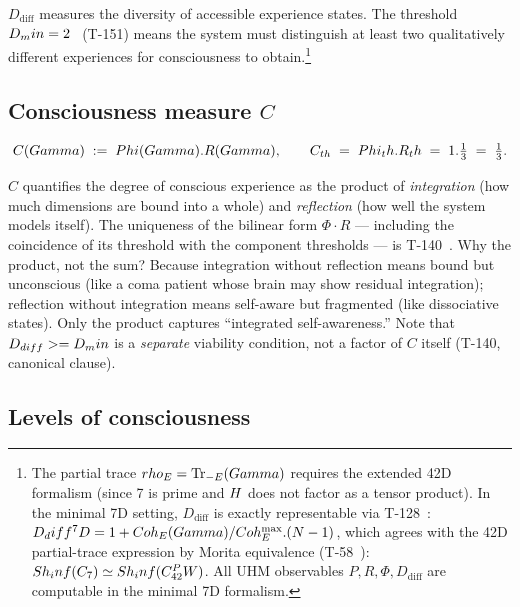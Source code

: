 $D_{\mathrm{diff}}$ measures the diversity of accessible experience states. The threshold
$D_min = 2$~ (T-151) means the system must distinguish at least two qualitatively
different experiences for consciousness to obtain.\footnote{The partial trace
$rho_E = \Tr_{-E}(Gamma)$ requires the extended 42D formalism (since 7 is prime and
$H$ does not factor as a tensor product). In the minimal 7D setting, $D_{\mathrm{diff}}$
is exactly representable via T-128~: $D_diff^7D = 1 + Coh_E(Gamma)/Coh_E^{\max}.(N-1)$,
which agrees with the 42D partial-trace expression by Morita equivalence (T-58~):
$Sh_inf(C_7) \simeq Sh_inf(C_{42}^PW)$. All UHM observables
$P, R, \Phi, D_\mathrm{diff}$ are computable in the minimal 7D formalism.}

\subsection{Consciousness measure $C$}
\label{subsec:consciousness-measure}

\begin{definition}
\begin{equation}
  C(Gamma) \;:=\; Phi(Gamma) . R(Gamma),
  \qquad
  C_{th} \;=\; Phi_th . R_th \;=\; 1 . \tfrac{1}{3} \;=\; \tfrac{1}{3}.
  \label{eq:consciousness-measure}
\end{equation}
\end{definition}

$C$ quantifies the degree of conscious experience as the product of
\emph{integration} (how much dimensions are bound into a whole) and
\emph{reflection} (how well the system models itself). The uniqueness of the
bilinear form $\Phi \cdot R$ --- including the coincidence of its threshold
with the component thresholds --- is T-140~. Why the product, not
the sum? Because integration without reflection means bound but unconscious
(like a coma patient whose brain may show residual integration); reflection
without integration means self-aware but fragmented (like dissociative
states). Only the product captures ``integrated self-awareness.'' Note that
$D_{diff} >= D_min$ is a \emph{separate} viability condition,
not a factor of $C$ itself (T-140, canonical clause).

\subsection{Levels of consciousness}
\label{subsec:levels}

